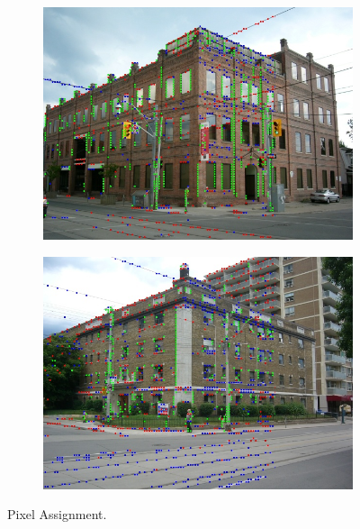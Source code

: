 \documentclass[a4paper]{article}
\begin{document}
	\begin{figure}[ht]
		\centering
		\begin{subfigure}
			\centering
			\includegraphics[width=0.9\columnwidth]{images/assignment1.jpg}
		\end{subfigure}
		\begin{subfigure}
			\centering
			\includegraphics[width=0.9\columnwidth]{images/assignment2.jpg}
		\end{subfigure}
		\caption{Pixel Assignment.}
	\end{figure}

	\clearpage
	
	
\end{document}
